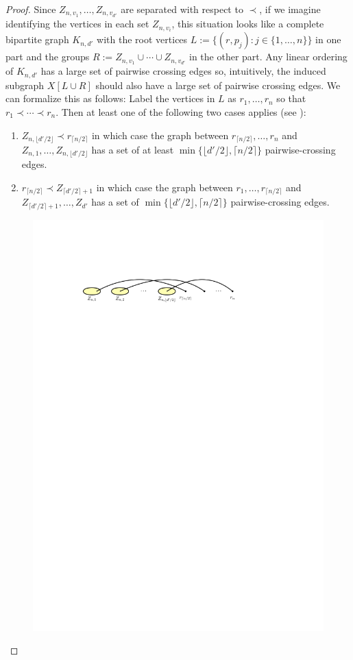 \documentclass[kpfonts]{patmorin}
\begin{document}
\begin{proof}
   Since $Z_{n,v_1},\ldots,Z_{n,v_{d'}}$ are separated with respect to $\prec$,
   if we imagine identifying the vertices in each set $Z_{n,v_i}$, this situation looks like a complete bipartite graph $K_{n,d'}$ with the root vertices $L:=\{(r,p_j):j\in\{1,\ldots,n\}\}$ in one part and the groups $R:=Z_{n,v_1}\cup\cdots\cup Z_{n,v_{d'}}$ in the other part.  Any linear ordering of $K_{n,d'}$ has a large set of pairwise crossing edges so, intuitively, the induced subgraph $X[L\cup R]$ should also have a large set of pairwise crossing edges. We can formalize this as follows: Label the vertices in $L$ as $r_1,\ldots,r_n$ so that $r_1\prec \cdots\prec r_{n}$.  Then at least one of the following two cases applies (see ):
    \begin{enumerate}
        \item $Z_{n,\lfloor d'/2\rfloor}\prec r_{\lceil n/2\rceil}$ in which case the graph between $r_{\lceil n/2\rceil},\ldots,r_{n}$ and $Z_{n,1},\ldots,Z_{n,\lfloor d'/2\rfloor}$ has a set of at least $\min\{\lfloor d'/2\rfloor,\lceil n/2\rceil\}$ pairwise-crossing edges.
        \item $r_{\lceil n/2\rceil}\prec Z_{\lceil d'/2\rceil+1}$ in which case the graph between $r_1,\ldots,r_{\lceil n/2\rceil}$ and $Z_{\lceil d'/2\rceil+1},\ldots,Z_{d'}$ has a set of $\min\{\lfloor d'/2\rfloor,\lceil n/2\rceil\}$ pairwise-crossing edges.
    \end{enumerate}
	\begin{figure}[!h]
		\centering
			\includegraphics{figs/median-1} \\[2em]

\end{figure}
\end{proof}
\end{document}
